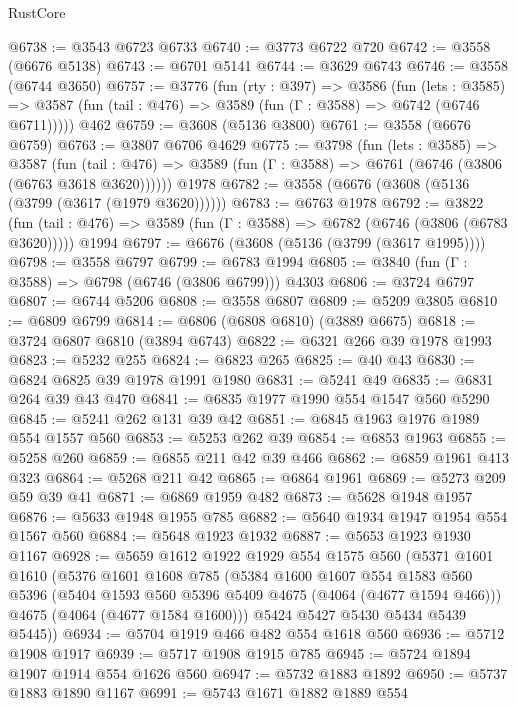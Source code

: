 \begin{lexlean}{RustCore}
\begin{coremodule}
@6738 := @3543 @6723 @6733
@6740 := @3773 @6722 @720
@6742 := @3558 (@6676 @5138)
@6743 := @6701 @5141
@6744 := @3629 @6743
@6746 := @3558 (@6744 @3650)
@6757 := @3776
    (fun (rty : @397) =>
    @3586
      (fun (lets : @3585) =>
      @3587 (fun (tail : @476) => @3589 (fun (Γ : @3588) => @6742 (@6746 @6711)))))
    @462
@6759 := @3608 (@5136 @3800)
@6761 := @3558 (@6676 @6759)
@6763 := @3807 @6706 @4629
@6775 := @3798
    (fun (lets : @3585) =>
    @3587
      (fun (tail : @476) => @3589 (fun (Γ : @3588) => @6761 (@6746 (@3806 (@6763 @3618 @3620))))))
    @1978
@6782 := @3558 (@6676 (@3608 (@5136 (@3799 (@3617 (@1979 @3620))))))
@6783 := @6763 @1978
@6792 := @3822
    (fun (tail : @476) => @3589 (fun (Γ : @3588) => @6782 (@6746 (@3806 (@6783 @3620)))))
    @1994
@6797 := @6676 (@3608 (@5136 (@3799 (@3617 @1995))))
@6798 := @3558 @6797
@6799 := @6783 @1994
@6805 := @3840 (fun (Γ : @3588) => @6798 (@6746 (@3806 @6799))) @4303
@6806 := @3724 @6797
@6807 := @6744 @5206
@6808 := @3558 @6807
@6809 := @5209 @3805
@6810 := @6809 @6799
@6814 := @6806 (@6808 @6810) (@3889 @6675)
@6818 := @3724 @6807 @6810 (@3894 @6743)
@6822 := @6321 @266 @39 @1978 @1993
@6823 := @5232 @255
@6824 := @6823 @265
@6825 := @40 @43
@6830 := @6824 @6825 @39 @1978 @1991 @1980
@6831 := @5241 @49
@6835 := @6831 @264 @39 @43 @470
@6841 := @6835 @1977 @1990 @554 @1547 @560 @5290
@6845 := @5241 @262 @131 @39 @42
@6851 := @6845 @1963 @1976 @1989 @554 @1557 @560
@6853 := @5253 @262 @39
@6854 := @6853 @1963
@6855 := @5258 @260
@6859 := @6855 @211 @42 @39 @466
@6862 := @6859 @1961 @413 @323
@6864 := @5268 @211 @42
@6865 := @6864 @1961
@6869 := @5273 @209 @59 @39 @41
@6871 := @6869 @1959 @482
@6873 := @5628 @1948 @1957
@6876 := @5633 @1948 @1955 @785
@6882 := @5640 @1934 @1947 @1954 @554 @1567 @560
@6884 := @5648 @1923 @1932
@6887 := @5653 @1923 @1930 @1167
@6928 := @5659
    @1612
    @1922
    @1929
    @554
    @1575
    @560
    (@5371
      @1601
      @1610
      (@5376
        @1601
        @1608
        @785
        (@5384
          @1600
          @1607
          @554
          @1583
          @560
          @5396
          (@5404 @1593 @560 @5396 @5409 @4675 (@4064 (@4677 @1594 @466)))
          @4675
          (@4064 (@4677 @1584 @1600)))
        @5424
        @5427
        @5430
        @5434
        @5439
        @5445))
@6934 := @5704 @1919 @466 @482 @554 @1618 @560
@6936 := @5712 @1908 @1917
@6939 := @5717 @1908 @1915 @785
@6945 := @5724 @1894 @1907 @1914 @554 @1626 @560
@6947 := @5732 @1883 @1892
@6950 := @5737 @1883 @1890 @1167
@6991 := @5743
    @1671
    @1882
    @1889
    @554

\end{coremodule}
\end{lexlean}
